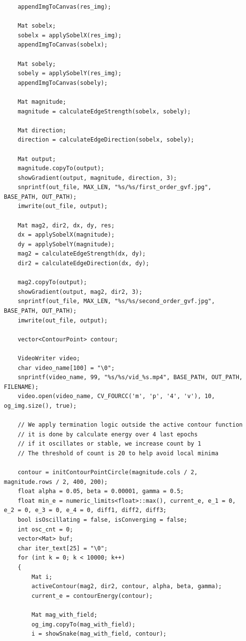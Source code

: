 \documentclass[12pt,a4paper]{report}
\begin{document}
\begin{lstlisting}
    appendImgToCanvas(res_img);

    Mat sobelx;
    sobelx = applySobelX(res_img);
    appendImgToCanvas(sobelx);

    Mat sobely;
    sobely = applySobelY(res_img);
    appendImgToCanvas(sobely);

    Mat magnitude;
    magnitude = calculateEdgeStrength(sobelx, sobely);

    Mat direction;
    direction = calculateEdgeDirection(sobelx, sobely);

    Mat output;
    magnitude.copyTo(output);
    showGradient(output, magnitude, direction, 3);
    snprintf(out_file, MAX_LEN, "%s/%s/first_order_gvf.jpg", BASE_PATH, OUT_PATH);
    imwrite(out_file, output);

    Mat mag2, dir2, dx, dy, res;
    dx = applySobelX(magnitude);
    dy = applySobelY(magnitude);
    mag2 = calculateEdgeStrength(dx, dy);
    dir2 = calculateEdgeDirection(dx, dy);

    mag2.copyTo(output);
    showGradient(output, mag2, dir2, 3);
    snprintf(out_file, MAX_LEN, "%s/%s/second_order_gvf.jpg", BASE_PATH, OUT_PATH);
    imwrite(out_file, output);

    vector<ContourPoint> contour;

    VideoWriter video;
    char video_name[100] = "\0";
    snprintf(video_name, 99, "%s/%s/vid_%s.mp4", BASE_PATH, OUT_PATH, FILENAME);
    video.open(video_name, CV_FOURCC('m', 'p', '4', 'v'), 10, og_img.size(), true);

    // We apply termination logic outside the active contour function
    // it is done by calculate energy over 4 last epochs
    // if it oscillates or stable, we increase count by 1
    // The threshold of count is 20 to help avoid local minima

    contour = initContourPointCircle(magnitude.cols / 2, magnitude.rows / 2, 400, 200);
    float alpha = 0.05, beta = 0.00001, gamma = 0.5;
    float min_e = numeric_limits<float>::max(), current_e, e_1 = 0, e_2 = 0, e_3 = 0, e_4 = 0, diff1, diff2, diff3;
    bool isOscillating = false, isConverging = false;
    int osc_cnt = 0;
    vector<Mat> buf;
    char iter_text[25] = "\0";
    for (int k = 0; k < 10000; k++)
    {
        Mat i;
        activeContour(mag2, dir2, contour, alpha, beta, gamma);
        current_e = contourEnergy(contour);

        Mat mag_with_field;
        og_img.copyTo(mag_with_field);
        i = showSnake(mag_with_field, contour);


\end{lstlisting}
\end{document}
